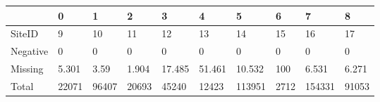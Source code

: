 \begin{tabular}{llllllllll}
\toprule
{} &      0 &      1 &      2 &       3 &       4 &       5 &     6 &       7 &      8 \\
\midrule
SiteID   &      9 &     10 &     11 &      12 &      13 &      14 &    15 &      16 &     17 \\
Negative &      0 &      0 &      0 &       0 &       0 &       0 &     0 &       0 &      0 \\
Missing  &  5.301 &   3.59 &  1.904 &  17.485 &  51.461 &  10.532 &   100 &   6.531 &  6.271 \\
Total    &  22071 &  96407 &  20693 &   45240 &   12423 &  113951 &  2712 &  154331 &  91053 \\
\bottomrule
\end{tabular}
